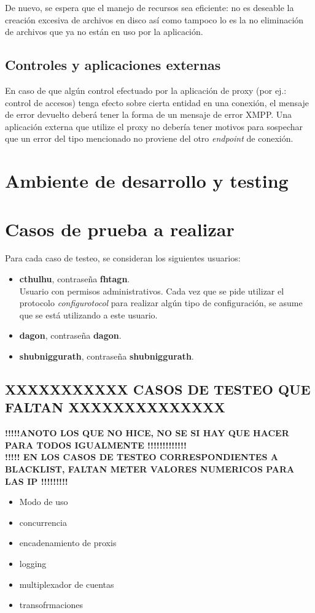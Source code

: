 \documentclass[a4paper,10pt]{article}
\begin{document}
De nuevo, se espera que el manejo de recursos sea eficiente: no es deseable la creación excesiva de archivos en disco así como tampoco lo es la no eliminación de archivos que ya no están en uso
por la aplicación.

\subsection{Controles y aplicaciones externas}
En caso de que algún control efectuado por la aplicación de proxy (por ej.: control de accesos) tenga efecto sobre cierta entidad en una conexión, el mensaje de error devuelto deberá tener
la forma de un mensaje de error XMPP. Una aplicación externa que utilize el proxy no debería tener motivos para sospechar que un error del tipo mencionado no proviene del otro
\textit{endpoint} de conexión.


\section{Ambiente de desarrollo y testing}
\section{Casos de prueba a realizar}
Para cada caso de testeo, se consideran los siguientes usuarios:
\begin{itemize}
  \item \textbf{cthulhu}, contraseña \textbf{fhtagn}.\\
	Usuario con permisos administrativos. Cada vez que se pide utilizar el protocolo \textit{configurotocol}
	para realizar algún tipo de configuración, se asume que se está utilizando a este usuario.
  \item \textbf{dagon}, contraseña \textbf{dagon}.
  \item \textbf{shubniggurath}, contraseña \textbf{shubniggurath}.
\end{itemize}

\subsection{XXXXXXXXXXX CASOS DE TESTEO QUE FALTAN XXXXXXXXXXXXXX}
\textbf{!!!!!ANOTO LOS QUE NO HICE, NO SE SI HAY QUE HACER PARA TODOS IGUALMENTE !!!!!!!!!!!!!}\\
\textbf{!!!!! EN LOS CASOS DE TESTEO CORRESPONDIENTES A BLACKLIST, FALTAN METER VALORES NUMERICOS PARA LAS IP !!!!!!!!!}
\begin{itemize}
 \item Modo de uso
 \item concurrencia
 \item encadenamiento de proxis
 \item logging
 \item multiplexador de cuentas
 \item transofrmaciones
\end{itemize}
\end{document}
